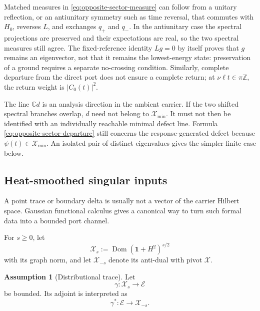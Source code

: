 \documentclass[11pt,reqno]{scrartcl}
\newcommand{\CC}{\mathbb C}
\newcommand{\ZZ}{\mathbb Z}
\newcommand{\idop}{\mathbf 1}
\DeclareMathOperator{\Dom}{Dom}
\newcommand{\scrX}{\mathscr X}
\newcommand{\scrE}{\mathscr E}
\newcommand{\Hmin}{\mathscr X_{\min}}
\theoremstyle{plain}
\theoremstyle{definition}
\newtheorem{assumption}[assumption]{Assumption}
\theoremstyle{remark}
\begin{document}
Matched measures in \eqref{eq:opposite-sector-measure} can follow from a
unitary reflection, or an antiunitary symmetry such as time reversal,
that commutes with $H_0$, reverses $L$, and exchanges $q_+$ and $q_-$.
In the antiunitary case the spectral projections are preserved and their
expectations are real, so the two spectral measures still agree.
The fixed-reference identity $Lg=0$ by itself proves
that $g$ remains an eigenvector, not that it remains the lowest-energy
state: preservation of a ground requires a separate no-crossing condition.
Similarly, complete departure from the direct port does not ensure a
complete return; at $\nu\ell t\in\pi\ZZ$, the return weight is
$|C_0(t)|^2$.

The line $\CC d$ is an analysis direction in the ambient carrier.  If the
two shifted spectral branches overlap, $d$ need not belong to $\Hmin$.
It must not then be identified with an individually reachable minimal
defect line.  Formula \eqref{eq:opposite-sector-departure} still concerns
the response-generated defect because $\psi(t)\in\Hmin$.  An isolated
pair of distinct eigenvalues gives the simpler finite case below.


\subsection{Heat-smoothed singular inputs}

A point trace or boundary delta is usually not a vector of the carrier
Hilbert space.  Gaussian functional calculus gives a canonical way to turn
such formal data into a bounded port channel.

For \(s\geq0\), let
\begin{equation}
  \scrX_s:=\Dom(\idop+H^2)^{s/2}
\end{equation}
with its graph norm, and let \(\scrX_{-s}\) denote its anti-dual with pivot
\(\scrX\).

\begin{assumption}[Distributional trace]
\label{ass:distributional-trace}
Let
\begin{equation}
  \gamma:\scrX_s\longrightarrow\scrE
\end{equation}
be bounded.  Its adjoint is interpreted as
\begin{equation}
  \gamma^*:\scrE\longrightarrow\scrX_{-s}.
\end{equation}
\end{assumption}
\end{document}
